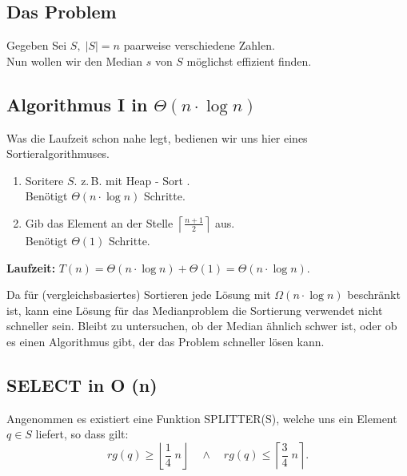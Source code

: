 \subsection{Das Problem}

Gegeben Sei $S, \; |S| = n$ paarweise verschiedene Zahlen.\\
Nun wollen wir den Median $s$ von $S$ möglichst effizient finden.

\subsection{Algorithmus I in $\Theta(n \cdot \log n)$}

Was die Laufzeit schon nahe legt, bedienen wir uns hier eines Sortieralgorithmuses.

\begin{enumerate}

\item Soritere $S$. z.\,B. mit Heap - Sort .\\
Benötigt $\Theta (n\cdot \log n)$ Schritte.

\item Gib das Element an der Stelle $\left\lceil \frac{n+1}{2} \right\rceil$ aus.\\
Benötigt $\Theta (1)$ Schritte.

\end{enumerate}

\textbf{Laufzeit: } $T(n) = \Theta (n \cdot \log n) + \Theta(1) = \Theta(n \cdot \log n)$.

\vspace{\baselineskip}

Da für (vergleichsbasiertes) Sortieren jede Lösung mit $\Omega (n \cdot \log n)$ beschränkt ist, kann eine Lösung für das Medianproblem die Sortierung verwendet nicht schneller sein. Bleibt zu untersuchen, ob der Median ähnlich schwer ist, oder ob es einen Algorithmus gibt, der das Problem schneller lösen kann.

\subsection{SELECT in O (n)}

Angenommen es existiert eine Funktion SPLITTER(S), welche uns ein Element $q\in S$ liefert, so dass gilt:\\
$$rg(q) \geq \left\lfloor \frac{1}{4} \; n \right\rfloor \quad \land \quad rg(q) \leq \left\lceil \frac{3}{4} \; n\right\rceil.$$

